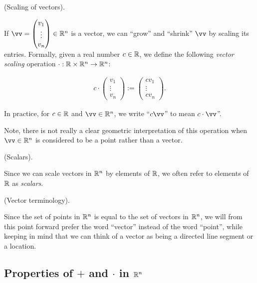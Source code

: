\begin{defn}
    (Scaling of vectors).

    If $\vv = \begin{pmatrix} v_1 \\ \vdots \\ v_n \end{pmatrix} \in \R^n$ is a vector, we can ``grow'' and ``shrink'' $\vv$ by scaling its entries. Formally, given a real number $c \in \mathbb{R}$, we define the following \textit{vector scaling} operation $\cdot:\mathbb{R} \times \mathbb{R}^n \rightarrow \mathbb{R}^n$:
    
    \begin{align*}
        c \cdot
        \begin{pmatrix}
            v_1 \\ \vdots \\ v_n
        \end{pmatrix}
        :=
        \begin{pmatrix}
            cv_1 \\ \vdots \\ cv_n
        \end{pmatrix}.
    \end{align*}
    
    In practice, for $c \in \mathbb{R}$ and $\vv \in \R^n$, we write ``$c \vv$'' to mean $c \cdot \vv$''.
    
    Note, there is not really a clear geometric interpretation of this operation when $\vv \in \R^n$ is considered to be a point rather than a vector.
\end{defn}

\begin{remark}
    (Scalars).
    
    Since we can scale vectors in $\mathbb{R}^n$ by elements of $\mathbb{R}$, we often refer to elements of $\mathbb{R}$ as \textit{scalars}.
\end{remark}

\begin{remark}
    (Vector terminology).
    
    Since the set of points in $\mathbb{R}^n$ is equal to the set of vectors in $\mathbb{R}^n$, we will from this point forward prefer the word ``vector'' instead of the word ``point'', while keeping in mind that we can think of a vector as being a directed line segment or a location.
\end{remark}

\subsection*{Properties of $+$ and $\cdot$ in $\mathbb{R}^n$}

